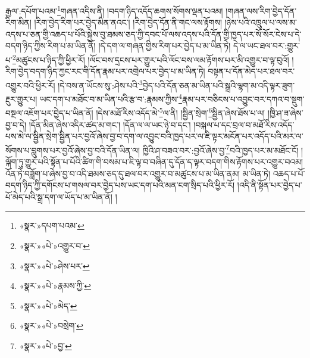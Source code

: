 རྒྱལ་:དཔོག་པའམ་\footnote{«སྣར་»དཔག་པའམ་}གཞན་འདིས་ནི། །བདག་ཉིད་འདོད་ཆགས་སོགས་ལྡན་པའམ། །གཞན་ལས་རིག་བྱེད་དོན་རིག་མིན། །རིག་བྱེད་རིག་པར་བྱེད་མིན་ནའང་། །རིག་བྱེད་དོན་ནི་གང་ལས་རྟོགས། །ཉེས་པའི་འཁྲུལ་པ་ལས་མ་འདས་པ་ཅན་གྱི་འཆད་པ་པོའི་སྐྱེས་བུ་ཐམས་ཅད་ཀྱི་དབང་པོ་ལས་འདས་པའི་དོན་གྱི་ཁྱད་པར་སོ་སོར་ངེས་པ་དེ་བདག་ཉིད་ཀྱིས་རིག་པ་མ་ཡིན་ནོ། །དེ་དག་ལ་གཞན་གྱིས་རིག་པར་བྱེད་པ་མ་ཡིན་ཏེ། དེ་ལ་ཡང་ཐལ་བར་:གྱུར་པ་\footnote{«སྣར་»«པེ་»འགྱུར་བ་}མཚུངས་པ་ཉིད་ཀྱི་ཕྱིར་རོ། །ལོང་བས་དྲངས་པར་གྱུར་པའི་ལོང་བས་ལམ་རྟོགས་པར་མི་འགྱུར་བ་ལྟ་བུའོ། །རིག་བྱེད་བདག་ཉིད་ཀྱང་རང་གི་དོན་རྣམ་པར་འགྲེལ་པར་བྱེད་པ་མ་ཡིན་ཏེ། བསྟན་པ་དོན་མེད་པར་ཐལ་བར་འགྱུར་བའི་ཕྱིར་རོ། །དེ་བས་ན་ཡོངས་སུ་:ཤེས་པའི་\footnote{«སྣར་»«པེ་»ཤེས་པར་}བྱེད་པའི་དོན་ཅན་མ་ཡིན་པའི་སྒྲའི་ལྷག་མ་འདི་ལྟར་ཟུག་རྔུར་གྱུར་པ། ཡང་དག་པ་མཐོང་བ་མ་ཡིན་པའི་རྩ་བ་:རྣམས་ཀྱིས་\footnote{«སྣར་»«པེ་»རྣམས་ཀྱི་}རྣམ་པར་བཅིངས་པ་འབྱུང་བར་དཀའ་བ་སྡུག་བསྔལ་འཇོག་པར་བྱེད་པ་ཡིན་ནོ། །དེས་མཐོ་རིས་འདོད་མེ་\footnote{«སྣར་»«པེ་»མེད་}ལ་ནི། །སྦྱིན་སྲེག་\footnote{«སྣར་»«པེ་»བསྲེག་}སྦྱིན་ཞེས་ཐོས་པ་ལ། །ཁྱི་ཤ་ཟ་ཞེས་བྱ་བ་དེ། །དོན་མིན་ཞེས་འདིར་ཚད་མ་གང་། །དོན་ལ་ལ་ཡང་ཉེ་བ་དང་། །བསྐལ་པ་དང་བྲལ་བ་མཐོ་རིས་འདོད་པས་མེ་ལ་སྦྱིན་སྲེག་སྦྱིན་པར་བྱའོ་ཞེས་བྱ་བ་དག་ལ་འབྱུང་བའི་ཁྱད་པར་ལ་ཇི་ལྟར་མངོན་པར་འདོད་པའི་མར་ལ་སོགས་པ་བླུགས་པར་བྱའོ་ཞེས་བྱ་བའི་དོན་ཡིན་ལ། ཁྱིའི་ཤ་བཟའ་བར་:བྱའོ་ཞེས་བྱ་\footnote{«སྣར་»«པེ་»བྱ་}བའི་ཁྱད་པར་མ་མཐོང་ངོ། །ལྐོག་ཏུ་གྱུར་པའི་སྟོན་པ་པོའི་ཚིག་གི་བསམ་པ་ཇི་ལྟ་བ་བཞིན་དུ་དོན་ད་ལྟར་བདག་གིས་རྟོགས་པར་འགྱུར་བའམ། འོན་ཏེ་བཟློག་པ་ཞེས་བྱ་བ་འདི་ཐམས་ཅད་དུ་ཐལ་བར་འགྱུར་བ་མཚུངས་པ་མ་ཡིན་ནམ། མ་ཡིན་ཏེ། འཆད་པ་པོ་བདག་ཉིད་ཀྱི་དགོངས་པ་གསལ་བར་བྱེད་པས་ཡང་དག་པའི་མན་ངག་སྲིད་པའི་ཕྱིར་རོ། །འདི་ནི་སྟོན་པར་བྱེད་པ་པོ་མེད་པའི་སྒྲ་དག་ལ་ཡོད་པ་མ་ཡིན་ནོ། །
